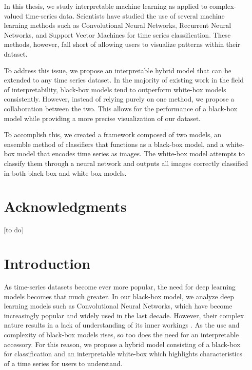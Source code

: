 \documentclass{turabian-thesis}
\begin{document}

In this thesis, we study interpretable machine learning as applied to complex-valued time-series data. Scientists have studied the use of several machine learning methods such as Convolutional Neural Networks, Recurrent Neural Networks, and Support Vector Machines for time series classification. These methods, however, fall short of allowing users to visualize patterns within their dataset.

To address this issue, we propose an interpretable hybrid model that can be extended to any time series dataset. In the majority of existing work in the field of interpretability, black-box models tend to outperform white-box models consistently. However, instead of relying purely on one method, we propose a collaboration between the two. This allows for the performance of a black-box model while providing a more precise visualization of our dataset.

To accomplish this, we created a framework composed of two models, an ensemble method of classifiers that functions as a black-box model, and a white-box model that encodes time series as images. The white-box model attempts to classify them through a neural network and outputs all images correctly classified in both black-box and white-box models.

\chapter{Acknowledgments}
[to do]
\tableofcontents
\listofillustrations

\mainmatter
\chapter{Introduction}
\label{chap:introduction}

As time-series datasets become ever more popular, the need for deep learning models becomes that much greater.
In our black-box model, we analyze deep learning models such as Convolutional Neural Networks, which have become increasingly popular and widely used in the last decade. However, their complex nature results in a lack of understanding of its inner workings \cite{wang_hybrid_2019}.
As the use and complexity of black-box models rises, so too does the need for an interpretable accessory. For this reason, we propose a hybrid model consisting of a black-box for classification and an interpretable white-box which highlights characteristics of a time series for users to understand.
\end{document}
